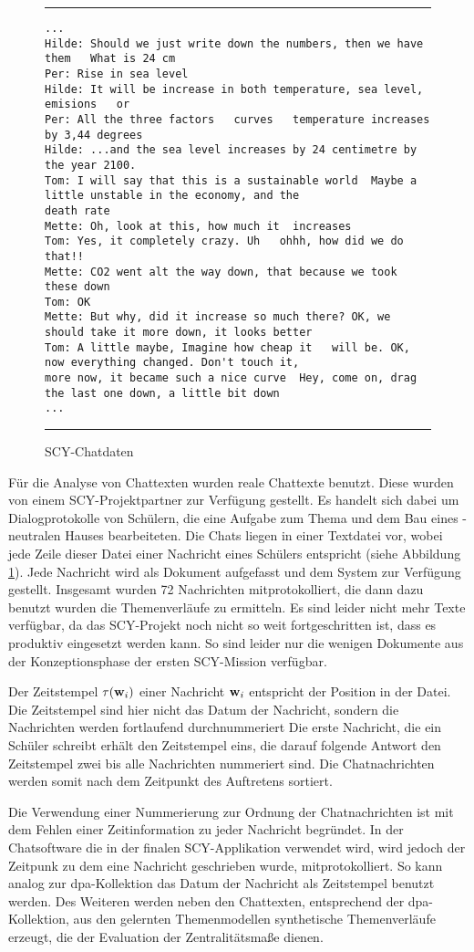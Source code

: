 \begin{figure}[ht]
\rule{\textwidth}{1px} 
\footnotesize
\begin{verbatim}
...
Hilde: Should we just write down the numbers, then we have them   What is 24 cm
Per: Rise in sea level
Hilde: It will be increase in both temperature, sea level, emisions   or  
Per: All the three factors   curves   temperature increases by 3,44 degrees
Hilde: ...and the sea level increases by 24 centimetre by the year 2100.
Tom: I will say that this is a sustainable world  Maybe a little unstable in the economy, and the 
death rate  
Mette: Oh, look at this, how much it  increases
Tom: Yes, it completely crazy. Uh   ohhh, how did we do that!!
Mette: CO2 went alt the way down, that because we took these down
Tom: OK
Mette: But why, did it increase so much there? OK, we should take it more down, it looks better 
Tom: A little maybe, Imagine how cheap it   will be. OK, now everything changed. Don't touch it, 
more now, it became such a nice curve  Hey, come on, drag the last one down, a little bit down 
...
\end{verbatim}
\rule{\textwidth}{1px} 
\caption{SCY-Chatdaten}
\label{fig:scyChat}
\end{figure}

Für die Analyse von Chattexten wurden reale Chattexte benutzt. Diese wurden von einem SCY-Projektpartner zur Verfügung gestellt. Es handelt sich dabei um Dialogprotokolle von Schülern, die eine Aufgabe zum Thema \COTWO und dem Bau eines \COTWO-neutralen Hauses bearbeiteten. Die Chats liegen in einer Textdatei vor, wobei jede Zeile dieser Datei einer Nachricht eines Schülers entspricht (siehe Abbildung \ref{fig:scyChat}). Jede Nachricht wird als Dokument aufgefasst und dem System zur Verfügung gestellt. Insgesamt wurden 72 Nachrichten mitprotokolliert, die dann dazu benutzt wurden die Themenverläufe zu ermitteln. Es sind leider nicht mehr Texte verfügbar, da das SCY-Projekt noch nicht so weit fortgeschritten ist, dass es produktiv eingesetzt werden kann. So sind leider nur die wenigen Dokumente aus der Konzeptionsphase der ersten SCY-Mission verfügbar. 

Der Zeitstempel $\tau(\mathbf{w}_i)$ einer Nachricht $\mathbf{w}_i$ entspricht der Position in der Datei. Die Zeitstempel sind hier nicht das Datum der Nachricht, sondern die Nachrichten werden fortlaufend durchnummeriert Die erste Nachricht, die ein Schüler schreibt erhält den Zeitstempel eins, die darauf folgende Antwort den Zeitstempel zwei bis alle Nachrichten nummeriert sind. Die Chatnachrichten werden somit nach dem Zeitpunkt des Auftretens sortiert. 

Die Verwendung einer Nummerierung zur Ordnung der Chatnachrichten ist mit dem Fehlen einer Zeitinformation zu jeder Nachricht begründet. In der Chatsoftware die in der finalen SCY-Applikation verwendet wird, wird jedoch der Zeitpunk zu dem eine Nachricht geschrieben wurde, mitprotokolliert. So kann analog zur dpa-Kollektion das Datum der Nachricht als Zeitstempel benutzt werden. Des Weiteren werden neben den Chattexten, entsprechend der dpa-Kollektion, aus den gelernten Themenmodellen synthetische Themenverläufe erzeugt, die der Evaluation der Zentralitätsmaße dienen.